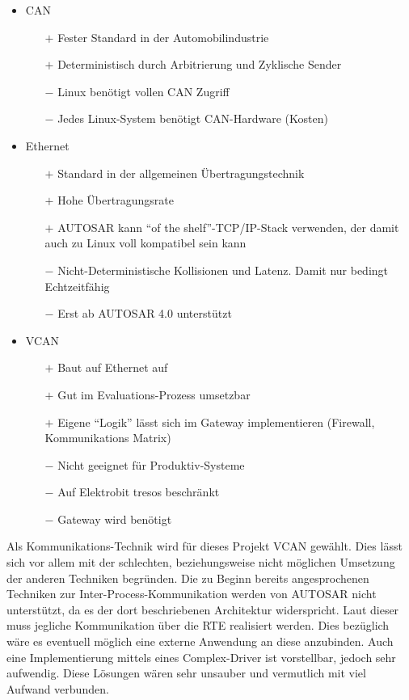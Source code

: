 \documentclass[
  a4paper,					    %
  twoside,
  DIV=calc,     				%
  bibliography=totoc,
  cleardoublepage=empty,
  ngerman,     					%
  final       					%
]{scrbook}
\begin{document}
\begin{itemize}
    \item CAN
    \begin{itemize}
        \item[$+$] Fester Standard in der Automobilindustrie
        \item[$+$] Deterministisch durch Arbitrierung und Zyklische Sender
        \item[$-$] Linux benötigt vollen CAN Zugriff
        \item[$-$] Jedes Linux-System benötigt CAN-Hardware (Kosten)
    \end{itemize}
    \item Ethernet
    \begin{itemize}
        \item[$+$] Standard in der allgemeinen Übertragungstechnik
        \item[$+$] Hohe Übertragungsrate
        \item[$+$] AUTOSAR kann "`of the shelf"'-TCP/IP-Stack verwenden, der damit auch zu Linux voll kompatibel sein kann\cite[S. 21]{autosar_eth}
        \item[$-$] Nicht-Deterministische Kollisionen und Latenz. Damit nur bedingt Echtzeitfähig
        \item[$-$] Erst ab AUTOSAR 4.0 unterstützt
    \end{itemize}
    \item VCAN
    \begin{itemize}
        \item[$+$] Baut auf Ethernet auf
        \item[$+$] Gut im Evaluations-Prozess umsetzbar
        \item[$+$] Eigene "`Logik"' lässt sich im Gateway implementieren (Firewall, Kommunikations Matrix)
        \item[$-$] Nicht geeignet für Produktiv-Systeme
        \item[$-$] Auf Elektrobit tresos beschränkt
        \item[$-$] Gateway wird benötigt
    \end{itemize}
\end{itemize}

Als Kommunikations-Technik wird für dieses Projekt VCAN gewählt. Dies lässt sich vor allem mit der schlechten, beziehungsweise nicht möglichen Umsetzung der anderen Techniken begründen. Die zu Beginn bereits angesprochenen Techniken zur Inter-Process-Kommunikation werden von AUTOSAR nicht unterstützt, da es der dort beschriebenen Architektur widerspricht. Laut dieser muss jegliche Kommunikation über die RTE realisiert werden. Dies bezüglich wäre es eventuell möglich eine externe Anwendung an diese anzubinden. Auch eine Implementierung mittels eines Complex-Driver ist vorstellbar, jedoch sehr aufwendig. Diese Lösungen wären sehr unsauber und vermutlich mit viel Aufwand verbunden.
\end{document}
